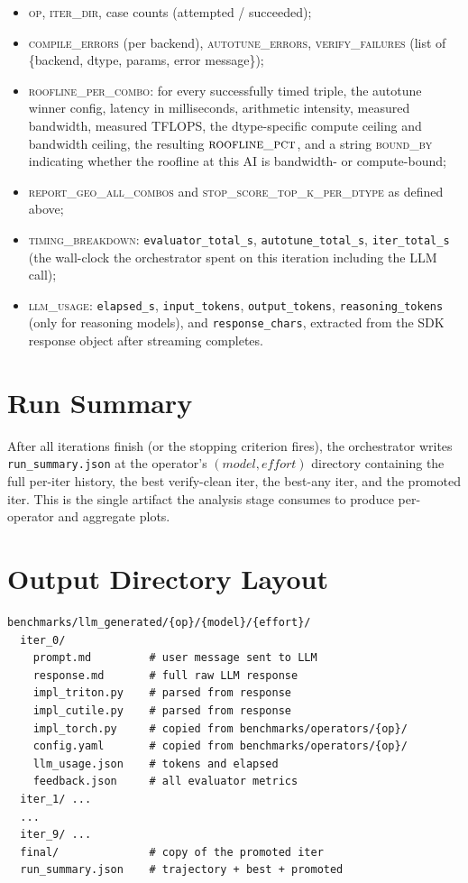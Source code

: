 \documentclass[11pt]{article}
\begin{document}
\begin{itemize}[leftmargin=*]
    \item \textsc{op}, \textsc{iter\_dir}, case counts (attempted /
    succeeded);
    \item \textsc{compile\_errors} (per backend), \textsc{autotune\_errors},
    \textsc{verify\_failures} (list of \{backend, dtype, params,
    error message\});
    \item \textsc{roofline\_per\_combo}: for every successfully timed
    triple, the autotune winner config, latency in milliseconds,
    arithmetic intensity, measured bandwidth, measured TFLOPS, the
    dtype-specific compute ceiling and bandwidth ceiling, the resulting
    $\textsc{roofline\_pct}$, and a string \textsc{bound\_by} indicating
    whether the roofline at this AI is bandwidth- or compute-bound;
    \item \textsc{report\_geo\_all\_combos} and
    \textsc{stop\_score\_top\_k\_per\_dtype} as defined above;
    \item \textsc{timing\_breakdown}:
    \texttt{evaluator\_total\_s},
    \texttt{autotune\_total\_s},
    \texttt{iter\_total\_s} (the wall-clock the orchestrator spent on
    this iteration including the LLM call);
    \item \textsc{llm\_usage}:
    \texttt{elapsed\_s},
    \texttt{input\_tokens},
    \texttt{output\_tokens},
    \texttt{reasoning\_tokens} (only for reasoning models), and
    \texttt{response\_chars}, extracted from the SDK response object
    after streaming completes.
\end{itemize}

\section{Run Summary}

After all iterations finish (or the stopping criterion fires), the
orchestrator writes \texttt{run\_summary.json} at the operator's
$(model, effort)$ directory containing the full per-iter history,
the best verify-clean iter, the best-any iter, and the promoted iter.
This is the single artifact the analysis stage consumes to produce
per-operator and aggregate plots.

\section{Output Directory Layout}

\begin{lstlisting}
benchmarks/llm_generated/{op}/{model}/{effort}/
  iter_0/
    prompt.md         # user message sent to LLM
    response.md       # full raw LLM response
    impl_triton.py    # parsed from response
    impl_cutile.py    # parsed from response
    impl_torch.py     # copied from benchmarks/operators/{op}/
    config.yaml       # copied from benchmarks/operators/{op}/
    llm_usage.json    # tokens and elapsed
    feedback.json     # all evaluator metrics
  iter_1/ ...
  ...
  iter_9/ ...
  final/              # copy of the promoted iter
  run_summary.json    # trajectory + best + promoted
\end{lstlisting}
\end{document}

